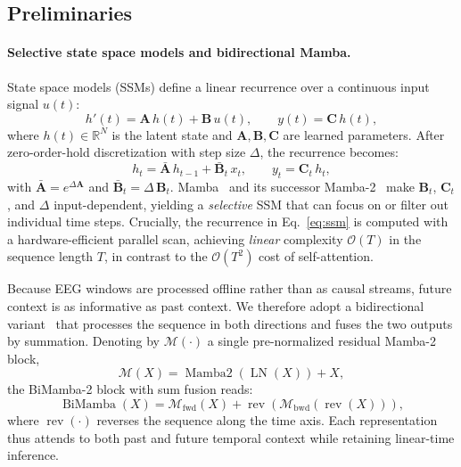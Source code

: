 \documentclass{article}
\begin{document}
\subsection{Preliminaries}

\paragraph{Selective state space models and bidirectional Mamba.}
State space models (SSMs) define a linear recurrence over a continuous input signal $u(t)$:
\begin{equation}
  h'(t) = \mathbf{A}\,h(t) + \mathbf{B}\,u(t), \qquad y(t) = \mathbf{C}\,h(t),
\end{equation}
where $h(t) \in \mathbb{R}^N$ is the latent state and $\mathbf{A}, \mathbf{B}, \mathbf{C}$ are learned parameters.
After zero-order-hold discretization with step size $\Delta$, the recurrence becomes:
\begin{equation}
  h_t = \bar{\mathbf{A}}\,h_{t-1} + \bar{\mathbf{B}}_t\,x_t, \qquad y_t = \mathbf{C}_t\,h_t,
  \label{eq:ssm}
\end{equation}
with $\bar{\mathbf{A}} = e^{\Delta \mathbf{A}}$ and $\bar{\mathbf{B}}_t = \Delta\,\mathbf{B}_t$.
Mamba~\citep{gu2024mamba} and its successor Mamba-2~\citep{pmlr-v235-dao24a} make $\mathbf{B}_t$, $\mathbf{C}_t$, and $\Delta$ input-dependent, yielding a \emph{selective} SSM that can focus on or filter out individual time steps.
Crucially, the recurrence in Eq.~\eqref{eq:ssm} is computed with a hardware-efficient parallel scan, achieving \emph{linear} complexity $\mathcal{O}(T)$ in the sequence length $T$, in contrast to the $\mathcal{O}(T^2)$ cost of self-attention.

Because EEG windows are processed offline rather than as causal streams, future context is as informative as past context.
We therefore adopt a bidirectional variant~\citep{bamunnet2026} that processes the sequence in both directions and fuses the two outputs by summation.
Denoting by $\mathcal{M}(\cdot)$ a single pre-normalized residual Mamba-2 block,
\begin{equation}
  \mathcal{M}(X) = \operatorname{Mamba2}(\operatorname{LN}(X)) + X,
\end{equation}
the BiMamba-2 block with sum fusion reads:
\begin{equation}
  \operatorname{BiMamba}(X) = \mathcal{M}_{\mathrm{fwd}}(X) + \operatorname{rev}\!\left(\mathcal{M}_{\mathrm{bwd}}\!\left(\operatorname{rev}(X)\right)\right),
  \label{eq:bimamba}
\end{equation}
where $\operatorname{rev}(\cdot)$ reverses the sequence along the time axis.
Each representation thus attends to both past and future temporal context while retaining linear-time inference.
\end{document}
